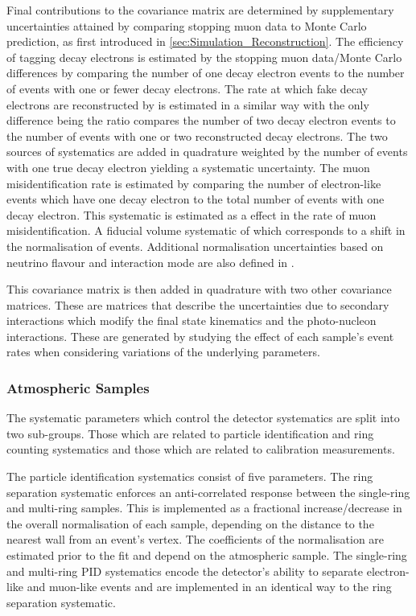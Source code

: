 Final contributions to the covariance matrix are determined by supplementary uncertainties attained by comparing stopping muon data to Monte Carlo prediction, as first introduced in \autoref{sec:Simulation_Reconstruction}. The efficiency of tagging decay electrons is estimated by the stopping muon data/Monte Carlo differences by comparing the number of one decay electron events to the number of events with one or fewer decay electrons. The rate at which fake decay electrons are reconstructed by \fq is estimated in a similar way with the only difference being the ratio compares the number of two decay electron events to the number of events with one or two reconstructed decay electrons. The two sources of systematics are added in quadrature weighted by the number of events with one true decay electron yielding a  systematic uncertainty. The muon misidentification rate is estimated by comparing the number of electron-like events which have one decay electron to the total number of events with one decay electron. This systematic is estimated as a  effect in the rate of muon misidentification. A fiducial volume systematic of  which corresponds to a  shift in the normalisation of events. Additional normalisation uncertainties based on neutrino flavour and interaction mode are also defined in \cite{t2k_tn_326, t2k_tn_186, t2k_tn_107}.

This covariance matrix is then added in quadrature with two other covariance matrices. These are matrices that describe the uncertainties due to secondary interactions which modify the final state kinematics and the photo-nucleon interactions. These are generated by studying the effect of each sample's event rates when considering variations of the underlying parameters.

\subsubsection{Atmospheric Samples}
\label{sec:SelsAndSysts_Systs_FDAtm}

The systematic parameters which control the detector systematics are split into two sub-groups. Those which are related to particle identification and ring counting systematics and those which are related to calibration measurements. 

The particle identification systematics consist of five parameters. The ring separation systematic enforces an anti-correlated response between the single-ring and multi-ring samples. This is implemented as a fractional increase/decrease in the overall normalisation of each sample, depending on the distance to the nearest wall from an event's vertex. The coefficients of the normalisation are estimated prior to the fit and depend on the atmospheric sample. The single-ring and multi-ring PID systematics encode the detector's ability to separate electron-like and muon-like events and are implemented in an identical way to the ring separation systematic.

